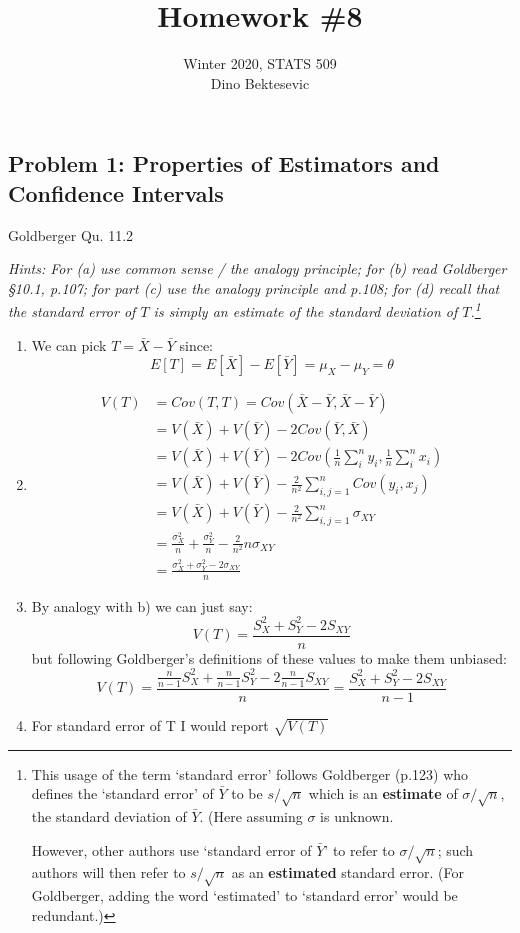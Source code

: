 \documentclass{article}
\date{{}}
\newcommand{\1}{\mathbf{1}}
\begin{document}
\title{Homework \#8}
\author{\normalsize{Winter 2020, STATS 509}\\
\normalsize{Dino Bektesevic}}
\maketitle

\subsection*{Problem 1: Properties of Estimators and Confidence Intervals}
Goldberger Qu. 11.2\par
 {\it Hints: For (a) use common sense / the analogy principle; for (b) read Goldberger \S 10.1, p.107; for part (c) use the analogy principle and p.108; for (d) recall that the standard error of $T$ is simply an estimate of the standard deviation of $T$.\footnote{This usage of the term `standard error' follows Goldberger (p.123) who defines the `standard error' of $\bar{Y}$ to be $s/\sqrt{n}$ which is an {\bf estimate} of $\sigma/\sqrt{n}$, the standard deviation of $\bar{Y}$. (Here assuming $\sigma$ is unknown.\par
  However, other authors use `standard error of $\bar{Y}$' to refer to $\sigma/\sqrt{n}$; such authors will then refer to $s/\sqrt{n}$ as an {\bf estimated} standard error.
(For Goldberger, adding the word `estimated' to `standard error' would be redundant.)}}
\begin{enumerate}
    \item We can pick $T=\bar X - \bar Y$ since:
    $$E[T] = E[\bar X] - E[\bar Y] = \mu_X - \mu_Y = \theta$$
    
    \item 
    \begin{align*}
        V(T) &= Cov(T, T) = Cov(\bar X - \bar Y, \bar X - \bar Y) \\
        &= V(\bar X) + V(\bar Y) - 2Cov(\bar Y, \bar X ) \\
        &= V(\bar X) + V(\bar Y) - 2Cov\left(\frac{1}{n}\sum_i^n y_i, \frac{1}{n}\sum_i^n x_i \right) \\
        &= V(\bar X) + V(\bar Y) - \frac{2}{n^2} \sum_{i,j=1}^n Cov(y_i, x_j) \\
        &= V(\bar X) + V(\bar Y) - \frac{2}{n^2} \sum_{i,j=1}^n \sigma_{XY}\\
        &= \frac{\sigma^2_X}{n} + \frac{\sigma^2_Y}{n} - \frac{2}{n^2} n \sigma_{XY} \\
        &= \frac{\sigma^2_X + \sigma^2_Y - 2\sigma_{XY}}{n} 
    \end{align*}
    
    \item By analogy with b) we can just say:
    $$V(T) =  \frac{S^2_X + S^2_Y - 2S_{XY}}{n} $$
    but following Goldberger's definitions of these values to make them unbiased:
    $$V(T) =  \frac{\frac{n}{n-1}S^2_X + \frac{n}{n-1}S^2_Y - 2\frac{n}{n-1}S_{XY}}{n} = \frac{S^2_X + S^2_Y - 2S_{XY}}{n-1}  $$
    
    \item For standard error of T I would report $\sqrt{V(T)}$
\end{enumerate}
\end{document}

